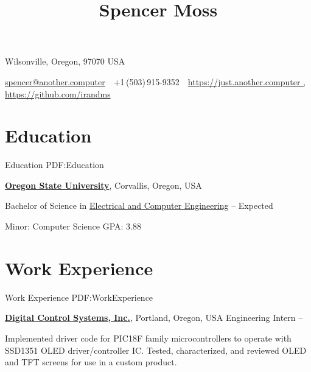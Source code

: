 \documentclass[letterpaper,MMMyyyy,nonstop]{simpleresumecv}
\newcommand{\CVAuthor}{Spencer Moss}
\newcommand{\CVWebpage}{https://just.another.computer , https://github.com/irandms}
\begin{document}

\title{\CVAuthor}

\begin{subtitle}
    Wilsonville, Oregon, 97070 USA

\par
\href{mailto:spencer@another.computer}
{spencer@another.computer}
\,\SubBulletSymbol\,
+1\,(503)\,915-9352
\,\SubBulletSymbol\,
\href{\CVWebpage}
{\CVWebpage}
\end{subtitle}

\begin{body}


\section
{Education}
{Education}
{PDF:Education}

\href{http://www.oregonstate.edu/}
{\textbf{Oregon State University}},
Corvallis, Oregon, USA

\GapNoBreak
\BulletItem
Bachelor of Science in
\href{http://www.eecs.oregonstate.edu/}
{Electrical and Computer Engineering}
\hfill
{} -- Expected 
\begin{detail}
\SubBulletItem
Minor: Computer Science
\SubBulletItem
GPA: 3.88
\iffalse
\SubBulletItem
Current Interest Areas:
Embedded Systems, FOSS/Linux, Controls/Sensor Systems, Computer Architecture, VLSI, FPGAs
\fi
\end{detail}


\section
{Work\newline
Experience}
{Work Experience}
{PDF:WorkExperience}

\href{http://www.dcs-inc.net}
{\textbf{Digital Control Systems, Inc.}},
Portland, Oregon, USA
\GapNoBreak
\BulletItem
Engineering Intern
\hfill
{} --
\begin{detail}
\SubBulletItem
Implemented driver code for PIC18F family microcontrollers to operate with SSD1351 OLED driver/controller IC.
\SubBulletItem
Tested, characterized, and reviewed OLED and TFT screens for use in a custom product.
\end{detail}


\end{body}
\end{document}
